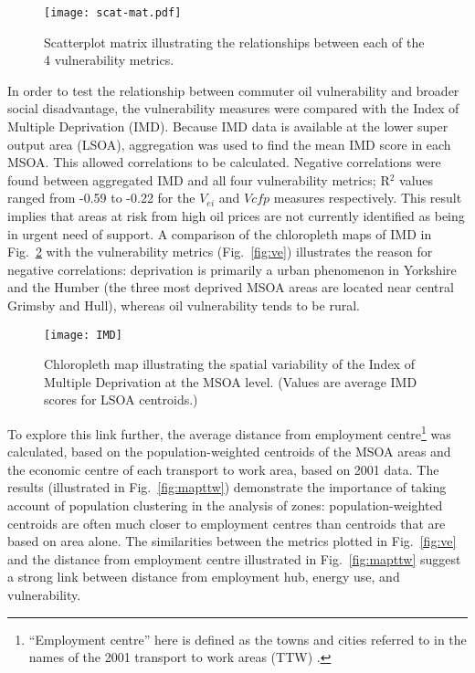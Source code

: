 \begin{figure}[t]
 \centering
\texttt{[image: scat-mat.pdf]}
 \caption[Scatterplot matrix of vulnerability metrics]
 {Scatterplot matrix illustrating the relationships between each of
the 4 vulnerability metrics.}
 \label{fig:scat-mat}
\end{figure}

In order to test the relationship between commuter oil vulnerability and
broader social disadvantage, the vulnerability measures were compared
with the Index of Multiple Deprivation (IMD). Because IMD data is available
at the lower super output area (LSOA), aggregation was used to find the mean
IMD score in each MSOA. This allowed correlations to be calculated.
Negative correlations were found between aggregated IMD and
all four vulnerability metrics; R$^2$ values ranged from -0.59 to -0.22
for the $V_{ei}$ and $V{cfp}$ measures respectively. This result implies that
areas at risk from high oil prices are not currently identified as
being in urgent need of support. A comparison of the chloropleth maps
of IMD in Fig.~\ref{fig:IMD} with the vulnerability metrics
(Fig.~\ref{fig:ve}) illustrates the reason
for negative correlations: deprivation is primarily a urban phenomenon in
Yorkshire and the Humber (the three most deprived MSOA areas
are located near central Grimsby and Hull),
whereas oil vulnerability tends to be rural.

\begin{figure}[t]
 \centering
\texttt{[image: IMD]}
 \caption[Chloropleth map of deprivation in Yorkshire and the Humber]
 {Chloropleth map illustrating the spatial variability of
the Index of Multiple Deprivation at the MSOA level. (Values are
average IMD scores for LSOA centroids.)}
 \label{fig:IMD}
\end{figure}

To explore this link further, the average distance from employment
centre\footnote{``Employment centre'' here is defined as the towns and cities
referred to in the names of the 2001 transport to work areas (TTW)
\citep{ONS2011-ttw}.} was calculated, based on the population-weighted centroids
of the MSOA areas and the economic centre of each transport to work area, based
on 2001 data. The results (illustrated in Fig.~\ref{fig:mapttw}) demonstrate
the importance of taking account of population clustering in the analysis of
zones: population-weighted centroids are often much closer to employment
centres than centroids that are based on area alone.
The similarities between
the metrics plotted in Fig.~\ref{fig:ve}
and the distance from employment centre illustrated in Fig.~\ref{fig:mapttw}
suggest a strong link between distance from employment hub, energy use, and
vulnerability.


